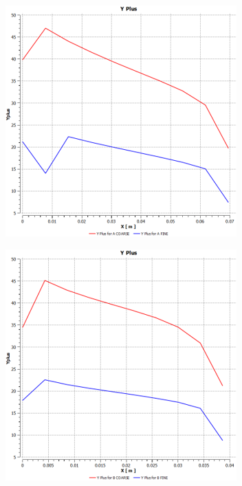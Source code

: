 \documentclass[12pt]{article} %
\begin{document}
\begin{minipage}{.49\linewidth}{}
\begin{center}
    \includegraphics[width=\linewidth]{YPlus_A.png}
    \label{fig:YPlusA}
\end{center}
\end{minipage}
\begin{minipage}{.49\linewidth}{}
\begin{center}
    \includegraphics[width=\linewidth]{YPlus_B.png}
    \label{fig:YPlusB}
\end{center}
\end{minipage}
\end{document}
